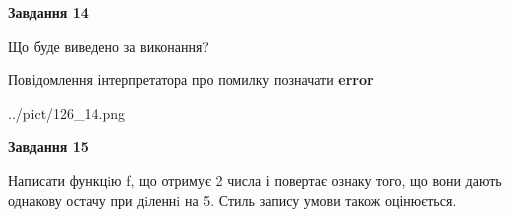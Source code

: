 \documentclass[11pt, ukrainian]{article}
\begin{document}
{\begin {large}
{\begin {center}\textbf{Завдання 14}\end {center}}\par
Що буде виведено за виконання? \par
Повідомлення інтерпретатора про помилку позначати \textbf{error}

\begin{center}
	{../pict/126_14.png}
\end{center}
\newpage

{\begin {center}\textbf{Завдання 15}\end {center}}\par

Написати функцiю f, що отримує 2 числа і повертає ознаку того, що вони дають однакову остачу при дiленнi на 5. Стиль запису умови також оцінюється.\par
\newpage

\end {large}}
\end{document}
